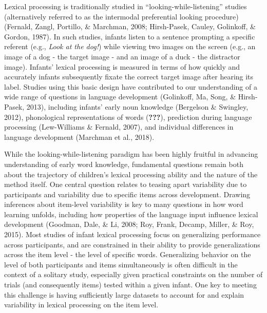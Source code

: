\documentclass[10pt, letterpaper]{article}
\begin{document}
Lexical processing is traditionally studied in
``looking-while-listening'' studies (alternatively referred to as the
intermodal preferential looking procedure) (Fernald, Zangl, Portillo, \&
Marchman, 2008; Hirsh-Pasek, Cauley, Golinkoff, \& Gordon, 1987). In
such studies, infants listen to a sentence prompting a specific referent
(e.g., \emph{Look at the dog!}) while viewing two images on the screen
(e.g., an image of a dog - the target image - and an image of a duck -
the distractor image). Infants' lexical processing is measured in terms
of how quickly and accurately infants subsequently fixate the correct
target image after hearing its label. Studies using this basic design
have contributed to our understanding of a wide range of questions in
language development (Golinkoff, Ma, Song, \& Hirsh-Pasek, 2013),
including infants' early noun knowledge (Bergelson \& Swingley, 2012),
phonological representations of words ({\textbf{???}}), prediction
during language processing (Lew-Williams \& Fernald, 2007), and
individual differences in language development (Marchman et al., 2018).

While the looking-while-listening paradigm has been highly fruitful in
advancing understanding of early word knowledge, fundamental questions
remain both about the trajectory of children's lexical processing
ability and the nature of the method itself. One central question
relates to teasing apart variability due to participants and variability
due to specific items across development. Drawing inferences about
item-level variability is key to many questions in how word learning
unfolds, including how properties of the language input influence
lexical development (Goodman, Dale, \& Li, 2008; Roy, Frank, Decamp,
Miller, \& Roy, 2015). Most studies of infant lexical processing focus
on generalizing performance across participants, and are constrained in
their ability to provide generalizations across the item level - the
level of specific words. Generalizing behavior on the level of both
participants and items simultaneously is often difficult in the context
of a solitary study, especially given practical constraints on the
number of trials (and consequently items) tested within a given infant.
One key to meeting this challenge is having sufficiently large datasets
to account for and explain variability in lexical processing on the item
level.
\end{document}
